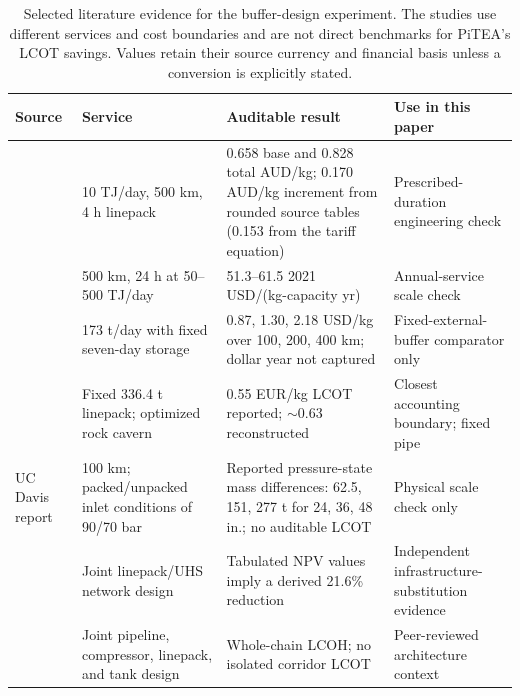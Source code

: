 \begin{table}[!t]
\centering
\caption{Selected literature evidence for the buffer-design experiment. The studies use different
services and cost boundaries and are not direct benchmarks for PiTEA's LCOT
savings. Values retain their source currency and financial basis unless a
conversion is explicitly stated.}
\label{tab:buffer_design_literature_si}
\scriptsize
\begin{tabularx}{\textwidth}{@{}p{}XXX@{}}
\toprule
Source & Service & Auditable result & Use in this paper \\
\midrule
\citet{GPA2022} & 10 TJ/day, 500 km, 4 h linepack & 0.658 base and 0.828 total AUD/kg; 0.170 AUD/kg increment from rounded source tables (0.153 from the tariff equation) & Prescribed-duration engineering check \\
\citet{GPA2022} & 500 km, 24 h at 50--500 TJ/day & 51.3--61.5 2021 USD/(kg-capacity yr) & Annual-service scale check \\
\citet{Purwanto2026} & 173 t/day with fixed seven-day storage & 0.87, 1.30, 2.18 USD/kg over 100, 200, 400 km; dollar year not captured & Fixed-external-buffer comparator only \\
\citet{Karlberg2025} & Fixed 336.4 t linepack; optimized rock cavern & 0.55 EUR/kg LCOT reported; ${\sim}$0.63 reconstructed & Closest accounting boundary; fixed pipe \\
UC Davis report \citep{Burke2024HydrogenStorageTransport} & 100 km; packed/unpacked inlet conditions of 90/70 bar & Reported pressure-state mass differences: 62.5, 151, 277 t for 24, 36, 48 in.; no auditable LCOT & Physical scale check only \\
\citet{Mhanna2023} & Joint linepack/UHS network design & Tabulated NPV values imply a derived 21.6\% reduction & Independent infrastructure-substitution evidence \\
\citet{Allansson2025} & Joint pipeline, compressor, linepack, and tank design & Whole-chain LCOH; no isolated corridor LCOT & Peer-reviewed architecture context \\
\bottomrule
\end{tabularx}
\end{table}
